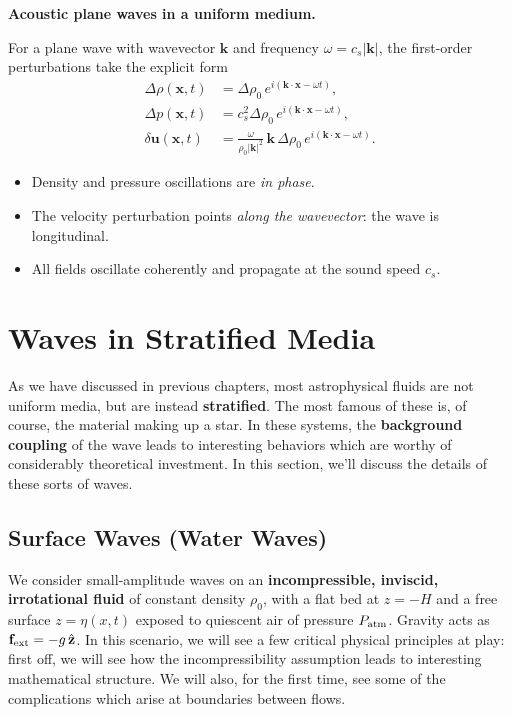 \begin{bigidea}
\textbf{Acoustic plane waves in a uniform medium.}

For a plane wave with wavevector $\mathbf{k}$ and frequency $\omega = c_s |\mathbf{k}|$,
the first-order perturbations take the explicit form
\[
\begin{aligned}
\Delta \rho(\mathbf{x},t) &= \Delta \rho_0 \, e^{i(\mathbf{k}\cdot\mathbf{x}-\omega t)}, \\
\Delta p(\mathbf{x},t)   &= c_s^2 \Delta \rho_0 \, e^{i(\mathbf{k}\cdot\mathbf{x}-\omega t)}, \\
\delta \mathbf{u}(\mathbf{x},t) &= 
\frac{\omega}{\rho_0 |\mathbf{k}|^2}\, \mathbf{k}\,\Delta \rho_0 \,
e^{i(\mathbf{k}\cdot\mathbf{x}-\omega t)}.
\end{aligned}
\]
\begin{itemize}
    \item Density and pressure oscillations are \emph{in phase}.
    \item The velocity perturbation points \emph{along the wavevector}: the wave is 
    longitudinal.
    \item All fields oscillate coherently and propagate at the sound speed $c_s$.
\end{itemize}
\end{bigidea}

\section{Waves in Stratified Media}

As we have discussed in previous chapters, most astrophysical fluids are not uniform media, but are instead \textbf{stratified}. The most famous of these is, of course, the material making up a star. In these systems, the \textbf{background coupling} of the wave leads to interesting behaviors which are worthy of considerably theoretical investment. In this section, we'll discuss the details of these sorts of waves.

\subsection{Surface Waves (Water Waves)}

We consider small-amplitude waves on an \textbf{incompressible, inviscid, irrotational fluid} of constant density $\rho_0$, with a flat bed at $z=-H$ and a free surface $z=\eta(x,t)$ exposed to quiescent air of pressure $P_{\rm atm}$. Gravity acts as ${\bf f}_{\rm ext}=-g\,\hat{\bf z}$. In this scenario, we will see a few critical physical principles at play: first off, we will see how the incompressibility assumption leads to interesting mathematical structure. We will also, for the first time, see some of the complications which arise at boundaries between flows.

